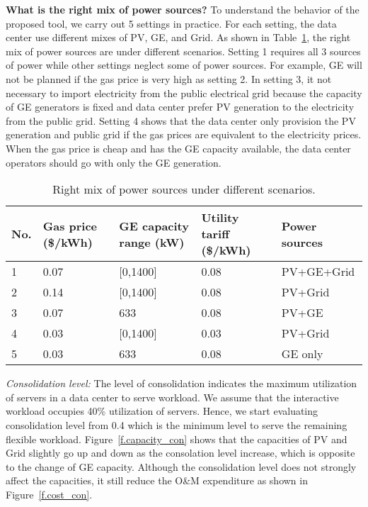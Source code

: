 \textbf{What is the right mix of power sources?} To understand the behavior of the proposed tool, we carry out 5 settings in practice. For each setting, the data center use different mixes of PV, GE, and Grid. As shown in Table~\ref{tbl:right_mix}, the right mix of power sources are under different scenarios. Setting 1 requires all 3 sources of power while other settings neglect some of power sources. For example, GE will not be planned if the gas price is very high as setting 2. In setting 3, it not necessary to import electricity from the public electrical grid because the capacity of GE generators is fixed and data center prefer PV generation to the electricity from the public grid. Setting 4 shows that the data center only provision the PV generation and public grid if the gas prices are equivalent to the electricity prices. When the gas price is cheap and has the GE capacity available, the data center operators should go with only the GE generation.

\begin{table}[!ht]
	\centering
	\caption{Right mix of power sources under different scenarios.}	
	\begin{tabular}{|p{0.5cm}|p{1cm}|p{1.2cm}|p{1cm}|p{2cm}|}
		\hline
		No. & Gas price (\$/kWh) & GE capacity range (kW) & Utility tariff (\$/kWh) & Power sources \\ \hline \hline
		1 & 0.07 & [0,1400] & 0.08 & PV+GE+Grid \\  \hline
		2 & 0.14 & [0,1400] & 0.08 & PV+Grid    \\  \hline
		3 & 0.07 & 633      & 0.08 & PV+GE      \\  \hline
		4 & 0.03 & [0,1400] & 0.03 & PV+Grid    \\  \hline
		5 & 0.03 & 633      & 0.08 & GE only    \\  \hline
	\end{tabular}
	\label{tbl:right_mix}
\end{table}


\emph{Consolidation level: } The level of consolidation indicates the maximum utilization of servers in a data center to serve workload. We assume that the interactive workload occupies 40\% utilization of servers. Hence, we start evaluating consolidation level from 0.4 which is the minimum level to serve the remaining flexible workload. Figure~\ref{f.capacity_con} shows that the capacities of PV and Grid slightly go up and down as the consolation level increase, which is opposite to the change of GE capacity. Although the consolidation level does not strongly affect the capacities, it still reduce the O\&M expenditure as shown in Figure~\ref{f.cost_con}.


